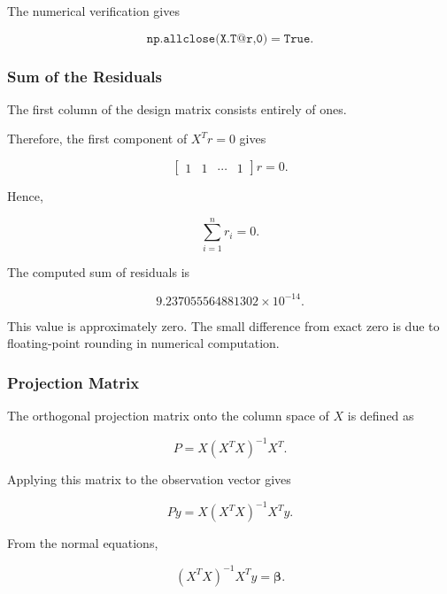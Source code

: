 \documentclass[12pt,a4paper]{article}
\numberwithin{equation}{section}
\begin{document}
The numerical verification gives

\begin{equation}
\texttt{np.allclose(X.T@r,0)}
=\texttt{True}.
\end{equation}

\subsubsection{Sum of the Residuals}

The first column of the design matrix consists
entirely of ones.

Therefore, the first component of $X^Tr=0$ gives

\begin{equation}
\begin{bmatrix}
1&1&\cdots&1
\end{bmatrix}r=0.
\end{equation}

Hence,

\begin{equation}
\boxed{\sum_{i=1}^{n}r_i=0}.
\end{equation}

The computed sum of residuals is

\begin{equation}
9.237055564881302\times10^{-14}.
\end{equation}

This value is approximately zero. The small
difference from exact zero is due to floating-point
rounding in numerical computation.

\subsubsection{Projection Matrix}

The orthogonal projection matrix onto the column
space of $X$ is defined as

\begin{equation}
\boxed{
P=X(X^TX)^{-1}X^T
}.
\end{equation}

Applying this matrix to the observation vector gives

\begin{equation}
Py=X(X^TX)^{-1}X^Ty.
\end{equation}

From the normal equations,

\begin{equation}
(X^TX)^{-1}X^Ty=\boldsymbol{\beta}.
\end{equation}
\end{document}
